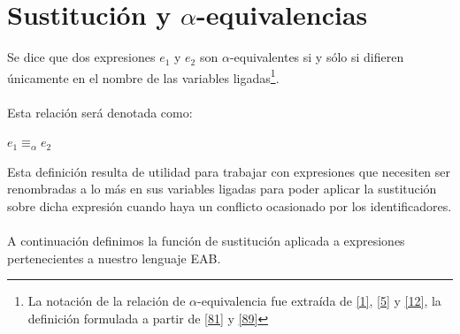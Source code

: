 \section{Sustitución y $\alpha$-equivalencias}
    \begin{definition} Se dice que dos expresiones $e_1$ y $e_2$ son $\alpha$-equivalentes si y sólo si difieren únicamente en el nombre de las variables ligadas\footnote{La notación de la relación de $\alpha$-equivalencia fue extraída de \hyperlink{1}{[1]}, \hyperlink{5}{[5]} y \hyperlink{12}{[12]}, la definición formulada a partir de \hyperlink{81}{[81]} y \hyperlink{89}{[89]}}.\\\\
    Esta relación será denotada como: 
    \begin{center}
            $e_1\equiv_\alpha e_2$        
    \end{center}
    \end{definition}

    Esta definición resulta de utilidad para trabajar con expresiones que necesiten ser renombradas a lo más en sus variables ligadas para poder aplicar la sustitución sobre dicha expresión cuando haya un conflicto ocasionado por los identificadores. \\\\
    A continuación definimos la función de sustitución aplicada a expresiones pertenecientes a nuestro lenguaje \textsf{EAB}.

